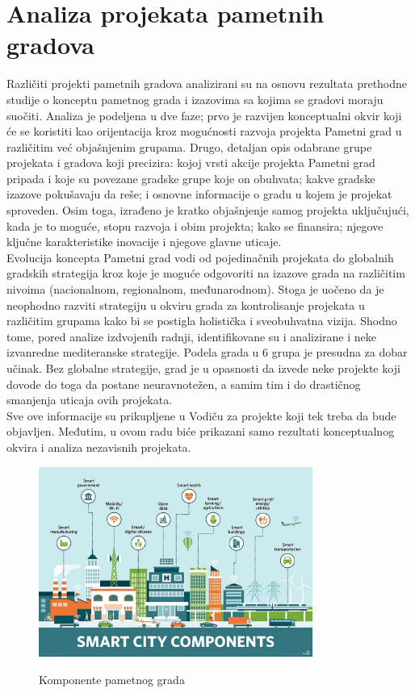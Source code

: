 \documentclass[a4paper,12pt]{article}
\begin{document}
{\section{Analiza projekata pametnih gradova}
\label{slike_i_tabele}

Različiti projekti pametnih gradova analizirani su na osnovu rezultata prethodne studije o konceptu pametnog grada i izazovima sa kojima se gradovi moraju suočiti. Analiza je podeljena u dve faze; prvo je razvijen konceptualni okvir koji će se koristiti kao orijentacija kroz mogućnosti razvoja projekta Pametni grad u različitim već objašnjenim grupama. Drugo, detaljan opis odabrane grupe projekata i gradova koji precizira: kojoj vrsti akcije projekta Pametni grad pripada i koje su povezane gradske grupe koje on obuhvata; kakve gradske izazove pokušavaju da reše; i osnovne informacije o gradu u kojem je projekat sproveden. Osim toga, izrađeno je kratko objašnjenje samog projekta uključujući, kada je to moguće, stopu razvoja i obim projekta; kako se finansira; njegove ključne karakteristike inovacije i njegove glavne uticaje. \\

Evolucija koncepta Pametni grad vodi od pojedinačnih projekata do globalnih gradskih strategija kroz koje je moguće odgovoriti na izazove grada na različitim nivoima (nacionalnom, regionalnom, međunarodnom). Stoga je uočeno da je neophodno razviti strategiju u okviru grada za kontrolisanje projekata u različitim grupama kako bi se postigla holistička i sveobuhvatna vizija. Shodno tome, pored analize izdvojenih radnji, identifikovane su i analizirane i neke izvanredne mediteranske strategije. Podela grada u 6 grupa je presudna za dobar učinak. Bez globalne strategije, grad je u opasnosti da izvede neke projekte koji dovode do toga da postane neuravnotežen, a samim tim i do drastičnog smanjenja uticaja ovih projekata. \\

Sve ove informacije su prikupljene u Vodiču za projekte koji tek treba da bude objavljen. Međutim, u ovom radu biće prikazani samo rezultati konceptualnog okvira i analiza nezavisnih projekata.\\

\begin{figure}[h!]
    \centering
    \includegraphics[width=0.8\textwidth]{pametni grad}
    \caption{Komponente pametnog grada}\cite{referenca5}
    \label{fig:slika}
\end{figure}





}
\end{document}
